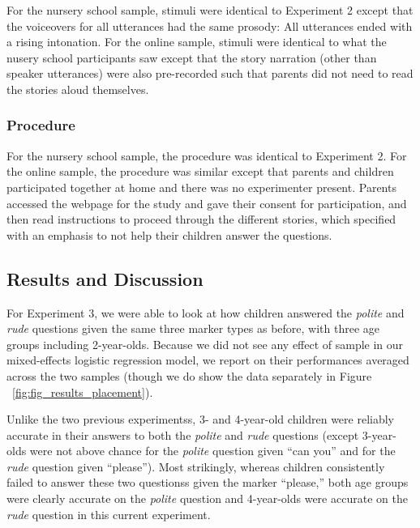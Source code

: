 \documentclass[10pt, letterpaper]{article}
\begin{document}
For the nursery school sample, stimuli were identical to Experiment 2
except that the voiceovers for all utterances had the same prosody: All
utterances ended with a rising intonation. For the online sample,
stimuli were identical to what the nusery school participants saw except
that the story narration (other than speaker utterances) were also
pre-recorded such that parents did not need to read the stories aloud
themselves.

\subsubsection{Procedure}\label{procedure-2}

For the nursery school sample, the procedure was identical to Experiment
2. For the online sample, the procedure was similar except that parents
and children participated together at home and there was no experimenter
present. Parents accessed the webpage for the study and gave their
consent for participation, and then read instructions to proceed through
the different stories, which specified with an emphasis to not help
their children answer the questions.

\subsection{Results and Discussion}\label{results-and-discussion-2}

For Experiment 3, we were able to look at how children answered the
\emph{polite} and \emph{rude} questions given the same three marker
types as before, with three age groups including 2-year-olds. Because we
did not see any effect of sample in our mixed-effects logistic
regression model, we report on their performances averaged across the
two samples (though we do show the data separately in Figure
~\ref{fig:fig_results_placement}).

Unlike the two previous experimentss, 3- and 4-year-old children were
reliably accurate in their answers to both the \emph{polite} and
\emph{rude} questions (except 3-year-olds were not above chance for the
\emph{polite} question given ``can you'' and for the \emph{rude}
question given ``please''). Most strikingly, whereas children
consistently failed to answer these two questionss given the marker
``please,'' both age groups were clearly accurate on the \emph{polite}
question and 4-year-olds were accurate on the \emph{rude} question in
this current experiment.
\end{document}

